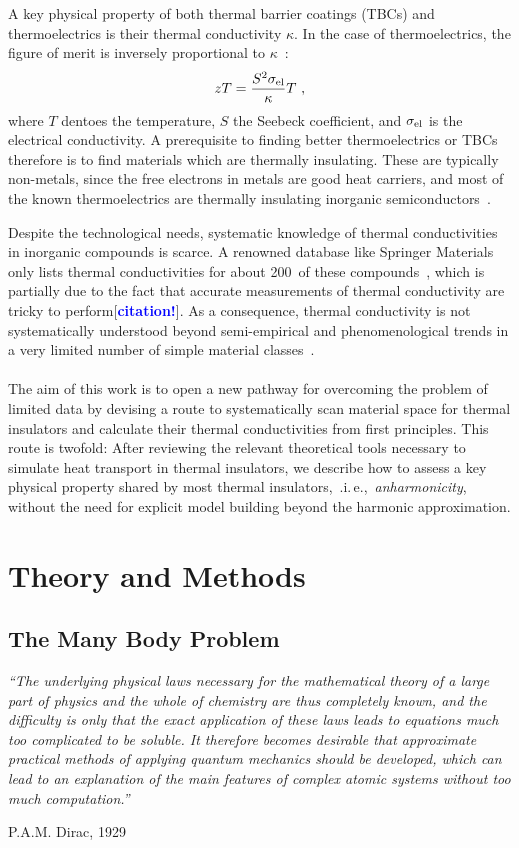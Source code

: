 \documentclass[a4paper,12pt]{book}
\newcommand{\REM}[1]{\textcolor{blue}{{\bf #1}}}
\begin{document}
A key physical property of both thermal barrier coatings (TBCs) and thermoelectrics is their thermal conductivity $\kappa$. In the case of thermoelectrics, the figure of merit is inversely proportional to $\kappa$~\cite{Nolas2001}:
\begin{align}
	zT = \frac{S^2 \sigma_{\rm el}}{\kappa} T~,
	\label{eq:zT}
\end{align} 
where $T$ dentoes the temperature, $S$ the Seebeck coefficient, and $\sigma_{\rm el}$ is the electrical conductivity.
A prerequisite to finding better thermoelectrics or TBCs therefore is to find materials which are thermally insulating. These are typically non-metals, since the free electrons in metals are good heat carriers, and most of the known thermoelectrics are thermally insulating inorganic semiconductors~\cite[p.\,15]{Nolas2001}.


Despite the technological needs, systematic knowledge of thermal conductivities in inorganic compounds is scarce. A renowned database like Springer Materials only lists thermal conductivities for about 200~of these compounds~\cite{SpringerMaterials}, which is partially due to the fact that accurate measurements of thermal conductivity are tricky to perform[\REM{citation!}]. As a consequence, thermal conductivity is not systematically understood beyond semi-empirical and phenomenological trends in a very limited number of simple material classes~\cite{Morelli}.
\\ \\
The aim of this work is to open a new pathway for overcoming the problem of limited data by devising a route to systematically scan material space for thermal insulators and calculate their thermal conductivities from first principles. This route is twofold: After reviewing the relevant theoretical tools necessary to simulate heat transport in thermal insulators, we describe how to assess a key physical property shared by most thermal insulators,~.i.\,e.,~\emph{anharmonicity}, without the need for explicit model building beyond the harmonic approximation.

\chapter{Theory and Methods}

\section{The Many Body Problem}
\epigraph{\singlespacing \it ``The underlying physical laws necessary
for the mathematical theory of a large part of physics and the whole of chemistry
are thus completely known, and the difficulty is only that the exact application
of these laws leads to equations much too complicated to be soluble. It therefore becomes desirable that approximate practical methods of applying quantum
mechanics should be developed, which can lead to an explanation of the main
features of complex atomic systems without too much computation.''}{P.A.M. Dirac, 1929}
\end{document}
